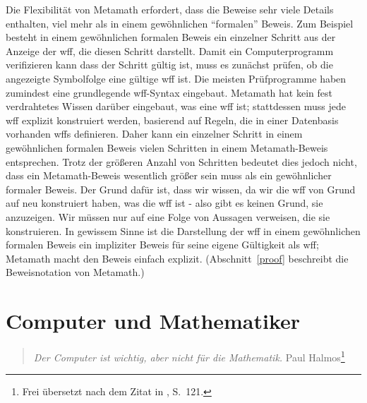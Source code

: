 Die Flexibilität von Metamath erfordert, dass die Beweise sehr viele Details enthalten, viel mehr als in einem gewöhnlichen "`formalen"' Beweis.
Zum Beispiel besteht in einem gewöhnlichen formalen Beweis ein einzelner Schritt aus der Anzeige der wff, die diesen Schritt darstellt.  Damit ein Computerprogramm verifizieren kann dass der Schritt gültig ist, muss es zunächst prüfen, ob die angezeigte Symbolfolge eine gültige wff ist. Die meisten Prüfprogramme haben zumindest eine grundlegende wff-Syntax eingebaut.
Metamath hat kein fest verdrahtetes Wissen darüber eingebaut, was eine wff ist; stattdessen muss jede wff explizit konstruiert werden, basierend auf Regeln, die in einer Datenbasis vorhanden wffs definieren.
Daher kann ein einzelner Schritt in einem gewöhnlichen formalen Beweis vielen Schritten in einem Metamath-Beweis entsprechen. Trotz der größeren Anzahl von Schritten bedeutet dies jedoch nicht, dass ein Metamath-Beweis wesentlich größer sein muss als ein gewöhnlicher formaler Beweis. Der Grund dafür ist, dass wir wissen, da wir die wff von Grund auf neu konstruiert haben, was die wff ist - also gibt es keinen Grund, sie anzuzeigen.  Wir müssen nur auf eine Folge von Aussagen verweisen, die sie konstruieren.  In gewissem Sinne ist die Darstellung der wff in einem gewöhnlichen formalen Beweis ein impliziter Beweis für seine eigene Gültigkeit als wff; Metamath macht den Beweis einfach explizit. (Abschnitt~\ref{proof} beschreibt die Beweisnotation von Metamath.)

\section{Computer und Mathematiker}

\begin{quote}
  {\em Der Computer ist wichtig, aber nicht für die Mathematik.}
  \flushright\sc  Paul Halmos\footnote{Frei übersetzt nach dem Zitat in \cite{Albers}, S.~121.}\\
\end{quote}

